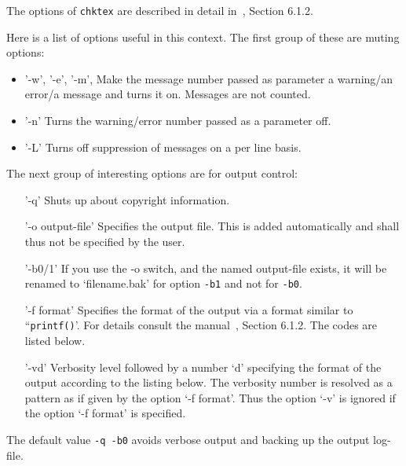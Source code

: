 The options of \texttt{chktex} 
are described in detail in~\cite{ChkTeX}, Section 6.1.2. 

Here is a list of options useful in this context. 
The first group of these are muting options: 
%
\begin{itemize}
\item '-w', '-e', '-m', 
Make the message number passed as parameter 
a warning/an error/a message and turns it on. 
Messages are not counted. 
\item '-n'
Turns the warning/error number passed as a parameter off. 
\item '-L'
Turns off suppression of messages on a per line basis. 
\end{itemize}

The next group of interesting options are for output control: 
%
\begin{itemize}
\item['-q']
Shuts up about copyright information.
\item['-o output-file']
Specifies the output file. This is added automatically 
and shall thus not be specified by the user. 
\item['-b0/1']
If you use the -o switch, and the named output-file exists,
it will be renamed to `filename.bak' for option \texttt{-b1} 
and not for \texttt{-b0}.
\item['-f format']
Specifies the format of the output 
via a format similar to ``\texttt{printf()}'. %
For details consult the manual~\cite{ChkTeX}, Section 6.1.2. 
The codes are listed below. 
\item['-vd']
Verbosity level followed by a number `d' 
specifying the format of the output according to the listing below. 
The verbosity number is resolved as a pattern 
as if given by the option `-f format'. 
Thus the option `-v' is ignored 
if the option `-f format' is specified. 
\end{itemize}

The default value \texttt{-q -b0} 
avoids verbose output and backing up the output log-file. 

